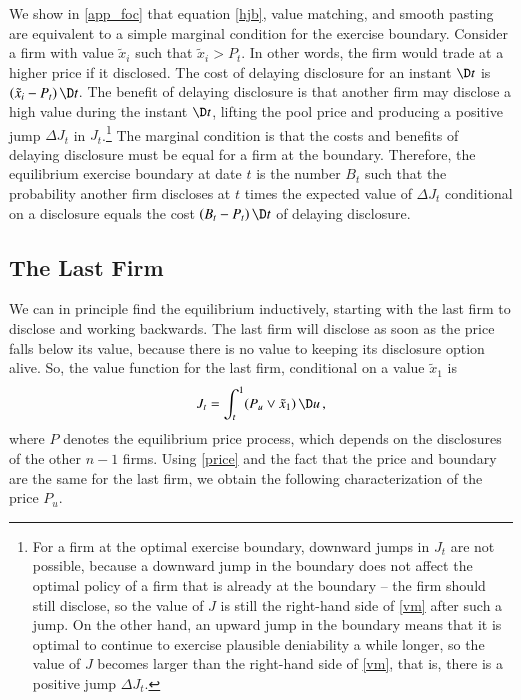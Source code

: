 \documentclass[authoryear,letterpaper,english,12pt]{elsarticle}
\begin{document}
We show in \ref{app_foc} that equation \eqref{hjb}, value matching, and smooth pasting are equivalent to a simple marginal condition for the exercise boundary.  Consider a firm with value $\tilde x_i$ such that $\tilde x_i > P_t$.  In other words, the firm would trade at a higher price if it disclosed.  The cost of delaying disclosure for an instant $\D t$ is $(\tilde x_i -P_t)\,\D t$.  The benefit of delaying disclosure is that another firm may disclose a high value during the instant $\D t$, lifting the pool price and producing a positive jump $\Delta J_t$ in $J_t$.\footnote{For a firm at the optimal exercise boundary, downward jumps in $J_t$ are not possible, because a  downward jump in the boundary does not affect the optimal policy of a firm that is already at the boundary -- the firm should still disclose, so the value of $J$ is still the right-hand side of \eqref{vm} after such a jump.  On the other hand, an upward jump in the boundary means that it is optimal to continue to exercise plausible deniability a while longer, so the value of $J$ becomes larger than the right-hand side of \eqref{vm}, that is, there is a positive jump $\Delta J_t$.}    The marginal condition is that the costs and benefits of delaying disclosure must be equal for a firm at the boundary.  Therefore, the equilibrium exercise boundary at date $t$ is the number $B_t$ such that the probability another firm discloses at $t$ times the expected value of $\Delta J_t$ conditional on a disclosure equals the cost $(B_t-P_t)\,\D t$ of delaying disclosure.  

\subsection{The Last Firm}

We can in principle find the equilibrium inductively, starting with the last firm to disclose and working backwards.  The last firm will disclose as soon as the price falls below its value, because there is no value to keeping its disclosure option alive.  So, the value function for the last firm, conditional on a value $\tilde x_1$ is
\begin{equation}\label{value:last}
    J_t = \int_t^1 (P_u \vee \tilde x_1)\,\D u\,,
\end{equation}
where $P$ denotes the equilibrium price process, which depends on the disclosures of the other $n-1$ firms.  Using \eqref{price} and the fact that the price and boundary are the same for the last firm, we obtain the following characterization of the price $P_u$.  
\end{document}
